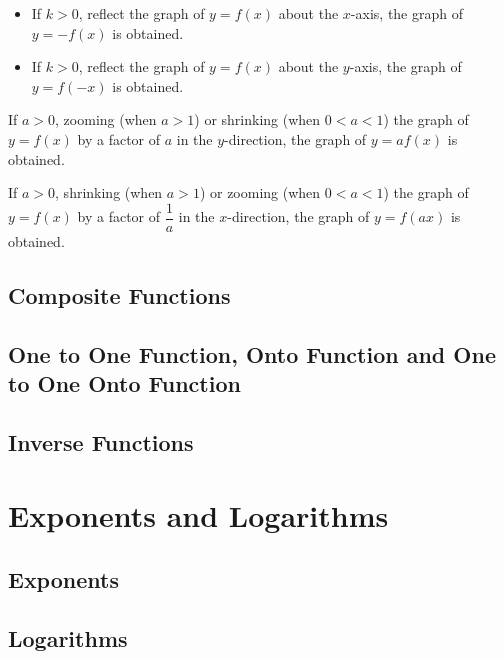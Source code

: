 \documentclass{report}
\begin{document}
\begin{mdframed}[style=MyFrame]
  \begin{itemize}[leftmargin=0.3cm]
    \item If $k > 0$, reflect the graph of $y = f(x)$ about the $x$-axis, the graph of $y
            = -f(x)$ is obtained.

    \item If $k > 0$, reflect the graph of $y = f(x)$ about the $y$-axis, the graph of $y
            = f(-x)$ is obtained.
  \end{itemize}
\end{mdframed}

\begin{mdframed}[style=MyFrame]
  If $a > 0$, zooming (when $a > 1$) or shrinking (when $0 < a < 1$) the graph of $y = f(x)$ by a factor of $a$ in the $y$-direction, the graph of $y = af(x)$ is obtained.
\end{mdframed}

\begin{mdframed}[style=MyFrame]
  If $a > 0$, shrinking (when $a > 1$) or zooming (when $0 < a < 1$) the graph of $y = f(x)$ by a factor of $\dfrac{1}{a}$ in the $x$-direction, the graph of $y = f(ax)$ is obtained.
\end{mdframed}

\section{Composite Functions}

\section{One to One Function, Onto Function and One to One Onto Function}

\section{Inverse Functions}

\chapter{Exponents and Logarithms}

\section{Exponents}

\section{Logarithms}
\end{document}
